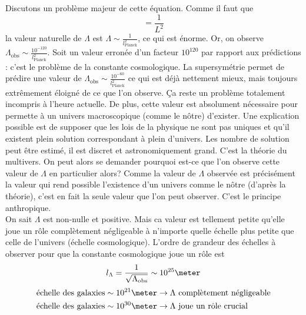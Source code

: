 \documentclass[a4paper,11pt]{report}
\begin{document}
            Discutons un problème majeur de cette équation. Comme il faut que
            \begin{equation}
                [\Lambda]=\frac{1}{L^2}
            \end{equation}
            la valeur naturelle de $\Lambda$ est $\Lambda\sim \frac{1}{l_{\text{Planck}}^2}$, ce qui est énorme. Or, on observe $\Lambda_{\text{obs}}\sim\frac{10^{-120}}{l_{\text{Planck}}^2}$. Soit un valeur erronée d'un facteur $10^{120}$ par rapport aux prédictions : c'est le problème de la constante cosmologique. La supersymétrie permet de prédire une valeur de $\Lambda_{\text{obs}}\sim\frac{10^{-60}}{l_{\text{Planck}}^2}$ ce qui est déjà nettement mieux, mais toujours extrêmement éloigné de ce que l'on observe. Ça reste un problème totalement incompris à l'heure actuelle. De plus, cette valeur est absolument nécessaire pour permette à un univers macroscopique (comme le nôtre) d'exister. Une explication possible est de supposer que les lois de la physique ne sont pas uniques et qu'il existent plein solution correspondant à plein d'univers. Les nombre de solution peut être estimé, il est discret et astronomiquement grand. C'est la théorie du multivers. On peut alors se demander pourquoi est-ce que l'on observe cette valeur de $\Lambda$ en particulier alors? Comme la valeur de $\Lambda$ observée est précisément la valeur qui rend possible l'existence d'un univers comme le nôtre (d'après la théorie), c'est en fait la seule valeur que l'on peut observer. C'est le principe anthropique.\\
            
            On sait $\Lambda$ est non-nulle et positive. Mais ca valeur est tellement petite qu'elle joue un rôle complètement négligeable à n'importe quelle échelle plus petite que celle de l'univers (échelle cosmologique). L'ordre de grandeur des échelles à observer pour que la constante cosmologique joue un rôle est 
            \begin{equation}
                l_\Lambda = \frac{1}{\sqrt{\Lambda_{\text{obs}}}}\sim 10^{25}\meter
            \end{equation}
            \begin{align}
                \text{échelle des galaxies} \sim 10^{21}\meter &\to \text{$\Lambda$ complètement négligeable}\\
                \text{échelle des galaxies} \sim 10^{30}\meter &\to \text{$\Lambda$ joue un rôle crucial}
            \end{align}
            
\end{document}
